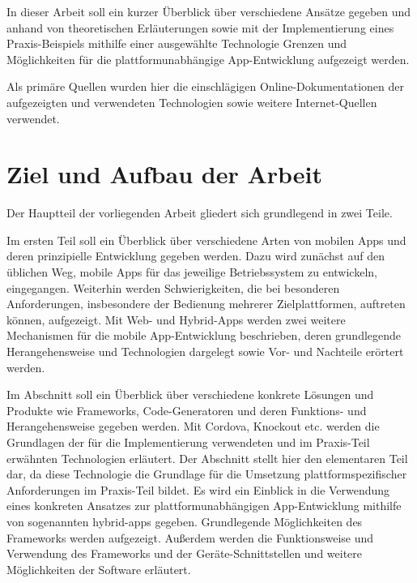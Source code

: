 In dieser Arbeit soll ein kurzer Überblick über verschiedene Ansätze gegeben und anhand von theoretischen Erläuterungen sowie mit der Implementierung eines Praxis-Beispiels mithilfe einer ausgewählte Technologie Grenzen und Möglichkeiten für die plattformunabhängige App-Entwicklung aufgezeigt werden.

	Als primäre Quellen wurden hier die einschlägigen Online-Dokumentationen der aufgezeigten und verwendeten Technologien sowie weitere Internet-Quellen verwendet. 
	
\section{Ziel und Aufbau der Arbeit}

Der Hauptteil der vorliegenden Arbeit gliedert sich grundlegend in zwei Teile.

Im ersten Teil  soll ein Überblick über verschiedene Arten von mobilen Apps und deren prinzipielle Entwicklung gegeben werden. 
Dazu wird zunächst auf den üblichen Weg, mobile Apps für das jeweilige Betriebssystem zu entwickeln, eingegangen. 
Weiterhin werden Schwierigkeiten, die bei besonderen Anforderungen, insbesondere der Bedienung mehrerer Zielplattformen, auftreten können, aufgezeigt.
Mit Web- und Hybrid-Apps werden zwei weitere Mechanismen für die mobile App-Entwicklung beschrieben, deren grundlegende Herangehensweise und Technologien dargelegt sowie Vor- und Nachteile erörtert werden.

	Im Abschnitt  soll ein Überblick über verschiedene konkrete Lösungen und Produkte wie Frameworks, Code-Generatoren und deren Funktions- und Herangehensweise gegeben werden.
	Mit Cordova, Knockout etc. werden die Grundlagen der für die Implementierung verwendeten und im Praxis-Teil erwähnten Technologien erläutert. 
	Der Abschnitt  stellt hier den elementaren Teil dar, da diese Technologie die Grundlage für die Umsetzung plattformspezifischer Anforderungen im Praxis-Teil bildet. Es wird ein Einblick in die Verwendung eines konkreten Ansatzes zur plattformunabhängigen App-Entwicklung mithilfe von sogenannten \glspl{hybrid-app} gegeben. Grundlegende Möglichkeiten des Frameworks werden aufgezeigt. Außerdem werden die Funktionsweise und Verwendung des Frameworks und der Geräte-Schnittstellen und weitere Möglichkeiten der Software erläutert.

